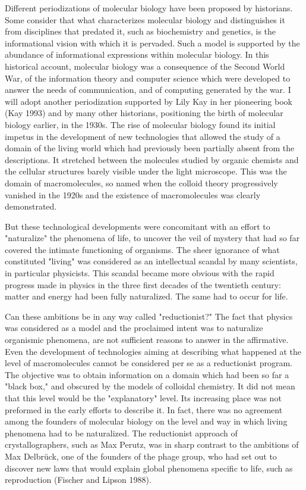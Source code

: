 \begin{longquote}
Different periodizations of molecular biology have been proposed by
historians. Some consider that what characterizes molecular biology and
distinguishes it from disciplines that predated it, such as biochemistry
and genetics, is the informational vision with which it is pervaded. Such
a model is supported by the abundance of informational expressions
within molecular biology. In this historical account, molecular biology
was a consequence of the Second World War, of the information theory
and computer science which were developed to answer the needs of
communication, and of computing generated by the war. I will adopt
another periodization supported by Lily Kay in her pioneering book (Kay
1993) and by many other historians, positioning the birth of molecular
biology earlier, in the 1930s. The rise of molecular biology found its
initial impetus in the development of new technologies that allowed the
study of a domain of the living world which had previously been partially
absent from the descriptions. It stretched between the molecules studied
by organic chemists and the cellular structures barely visible under the
light microscope. This was the domain of macromolecules, so named
when the colloid theory progressively vanished in the 1920s and the
existence of macromolecules was clearly demonstrated.

But these technological developments were concomitant with an effort
to "naturalize" the phenomena of life, to uncover the veil of mystery
that had so far covered the intimate functioning of organisms. The sheer
ignorance of what constituted "living" was considered as an intellectual
scandal by many scientists, in particular physicists. This scandal became
more obvious with the rapid progress made in physics in the three first
decades of the twentieth century: matter and energy had been fully
naturalized. The same had to occur for life.

Can these ambitions be in any way called "reductionist?" The fact
that physics was considered as a model and the proclaimed intent
was to naturalize organismic phenomena, are not sufficient reasons to
answer in the affirmative. Even the development of technologies aiming
at describing what happened at the level of macromolecules cannot
be considered per se as a reductionist program. The objective was to
obtain information on a domain which had been so far a "black box,"
and obscured by the models of colloidal chemistry. It did not mean that
this level would be the "explanatory" level. Its increasing place was
not preformed in the early efforts to describe it. In fact, there was no
agreement among the founders of molecular biology on the level and
way in which living phenomena had to be naturalized. The reductionist
approach of crystallographers, such as Max Perutz, was in sharp contrast
to the ambitions of Max Delbr{\"u}ck, one of the founders of the phage
group, who had set out to discover new laws that would explain global
phenomena specific to life, such as reproduction (Fischer and Lipson
1988).


\end{longquote}
